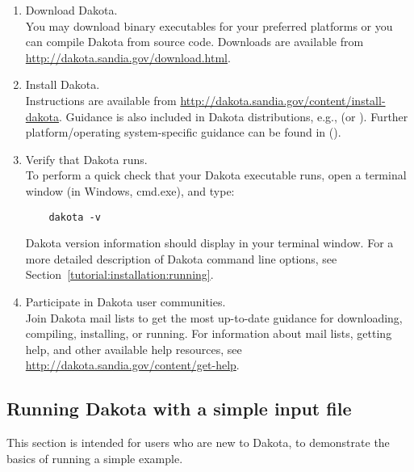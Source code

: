 \begin{enumerate}
  \item Download Dakota. \\
    You may download binary executables for your preferred platforms or 
    you can compile Dakota from source code. Downloads are available from 
    \url{http://dakota.sandia.gov/download.html}.
    
  \item Install Dakota. \\ Instructions are available from
    \url{http://dakota.sandia.gov/content/install-dakota}. Guidance is
    also included in Dakota distributions, e.g.,
     (or
    ). Further platform/operating
    system-specific guidance can be found in
    ().

  \item Verify that Dakota runs. \\
    To perform a quick check that your Dakota executable runs, open a 
    terminal window (in Windows, cmd.exe), and type: \\
    \vspace{-2em}
    \begin{small}
    \begin{verbatim}
    dakota -v
    \end{verbatim}
      \end{small}
    \vspace{-2em}
    Dakota version information should display in your terminal window.
    For a more detailed description of Dakota command line options, see
    Section~\ref{tutorial:installation:running}.

  \item Participate in Dakota user communities. \\
    Join Dakota mail lists to get the most up-to-date guidance for
    downloading, compiling, installing, or running. For information about
    mail lists, getting help, and other available help resources, see
    \url{http://dakota.sandia.gov/content/get-help}.

\end{enumerate}

\subsection{Running Dakota with a simple input file}\label{tutorial:quickstart:running}
This section is intended for users who are new to Dakota, to demonstrate the basics 
of running a simple example. 

